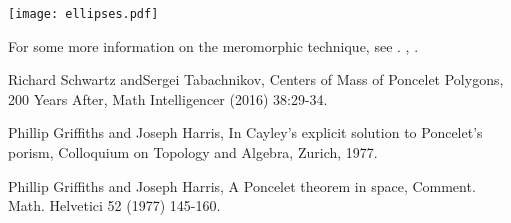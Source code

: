 \documentclass[11pt]{article}
\begin{document}
  \centering
 \texttt{[image: ellipses.pdf]}
 
 For some more information on the meromorphic technique, see  \cite{twohundred}. \cite{Cayley}, \cite{space}.
 
 \begin{thebibliography}{99}
 
  Richard Schwartz andSergei Tabachnikov,  Centers of Mass of Poncelet Polygons, 200 Years After, Math Intelligencer (2016) 38:29-34.

 Phillip Griffiths and Joseph Harris, In Cayley's explicit solution to Poncelet's porism,
Colloquium on Topology and Algebra, Zurich, 1977.

   Phillip Griffiths and Joseph Harris, 
A Poncelet theorem in space,  Comment. Math. Helvetici 52 (1977) 145-160.



\end{thebibliography}
\end{document}
